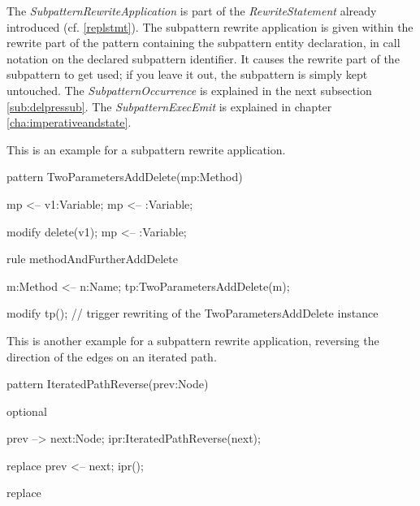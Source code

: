 \noindent The \emph{SubpatternRewriteApplication} is part of the \emph{RewriteStatement} already introduced (cf. \ref{replstmt}).
The subpattern rewrite application is given within the rewrite part of the pattern containing the subpattern entity declaration,
in call notation on the declared subpattern identifier.
It causes the rewrite part of the subpattern to get used; if you leave it out, the subpattern is simply kept untouched.
The \emph{SubpatternOccurrence} is explained in the next subsection \ref{sub:delpressub}.
The \emph{SubpatternExecEmit} is explained in chapter \ref{cha:imperativeandstate}.

\pagebreak

\begin{example}
This is an example for a subpattern rewrite application.

  \begin{grgen}
pattern TwoParametersAddDelete(mp:Method)
{
  mp <-- v1:Variable;
  mp <-- :Variable;

  modify {
    delete(v1);
    mp <-- :Variable;
  }
}
rule methodAndFurtherAddDelete
{
  m:Method <-- n:Name;
  tp:TwoParametersAddDelete(m);

  modify {
    tp(); // trigger rewriting of the TwoParametersAddDelete instance
  }
}
  \end{grgen}
\end{example}


\begin{example}
This is another example for a subpattern rewrite application,
reversing the direction of the edges on an iterated path.

  \begin{grgen}
pattern IteratedPathReverse(prev:Node)
{
  optional {
    prev --> next:Node;
    ipr:IteratedPathReverse(next);
    
    replace {
      prev <-- next;
      ipr();
    }
  }

  replace {
  }
}
  \end{grgen}
\end{example}

